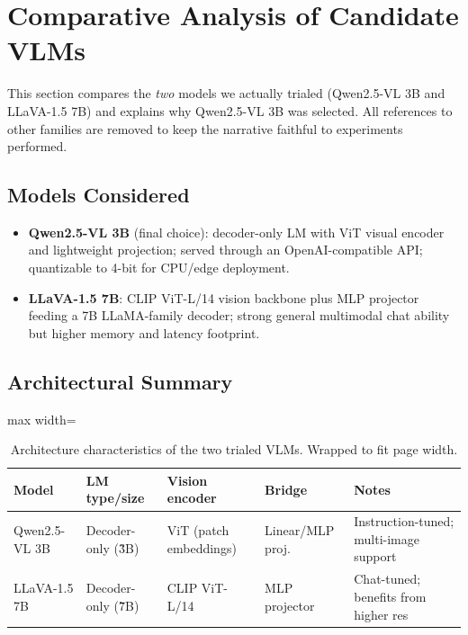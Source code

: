 \documentclass[11pt,a4paper]{article}
\begin{document}
\section{Comparative Analysis of Candidate VLMs}
This section compares the \emph{two} models we actually trialed (Qwen2.5-VL 3B and LLaVA-1.5 7B) and explains why Qwen2.5-VL 3B was selected. All references to other families are removed to keep the narrative faithful to experiments performed.

\subsection{Models Considered}
\begin{itemize}[leftmargin=*]
    \item \textbf{Qwen2.5-VL 3B} (final choice): decoder-only LM with ViT visual encoder and lightweight projection; served through an OpenAI-compatible API; quantizable to 4-bit for CPU/edge deployment.
    \item \textbf{LLaVA-1.5 7B}: CLIP ViT-L/14 vision backbone plus MLP projector feeding a 7B LLaMA-family decoder; strong general multimodal chat ability but higher memory and latency footprint.
\end{itemize}

\subsection{Architectural Summary}
\begin{table}[h]
\centering
\small
\begin{adjustbox}{max width=\textwidth}
\begin{tabular}{l l l l l}
    \toprule
Model & LM type/size & Vision encoder & Bridge & Notes \\
\midrule
Qwen2.5-VL 3B & Decoder-only (\~3B) & ViT (patch embeddings) & Linear/MLP proj. & Instruction-tuned; multi-image support \\
LLaVA-1.5 7B & Decoder-only (\~7B) & CLIP ViT-L/14 & MLP projector & Chat-tuned; benefits from higher res \\
\bottomrule
\end{tabular}
\end{adjustbox}
\caption{Architecture characteristics of the two trialed VLMs. Wrapped to fit page width.}
\label{tab:vlm-arch}
\end{table}
\end{document}
